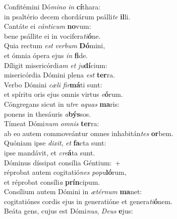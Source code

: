 \evenverse Confitémini Dó\textit{mi}\textit{no} \textit{in} \textbf{cí}thara:~\*\\
\evenverse in psaltério decem chordárum psálli\textit{te} \textbf{il}li.\\
\oddverse Cantáte ei \textit{cán}\textit{ti}\textit{cum} \textbf{no}vum:~\*\\
\oddverse bene psállite ei in vocifera\textit{ti}\textbf{ó}ne.\\
\evenverse Quia rectum \textit{est} \textit{ver}\textit{bum} \textbf{Dó}mini,~\*\\
\evenverse et ómnia ópera ejus \textit{in} \textbf{fi}de.\\
\oddverse Díligit misericórdi\textit{am} \textit{et} \textit{ju}\textbf{dí}cium:~\*\\
\oddverse misericórdia Dómini plena \textit{est} \textbf{ter}ra.\\
\evenverse Verbo Dómini \textit{cæ}\textit{li} \textit{fir}\textbf{má}ti sunt:~\*\\
\evenverse et spíritu oris ejus omnis virtus \textit{e}\textbf{ó}rum.\\
\oddverse Cóngregans sicut in u\textit{tre} \textit{a}\textit{quas} \textbf{ma}ris:~\*\\
\oddverse ponens in thesáuris \textit{a}\textbf{býs}sos.\\
\evenverse Tímeat Dómi\textit{num} \textit{om}\textit{nis} \textbf{ter}ra:~\*\\
\evenverse ab eo autem commoveántur omnes inhabitán\textit{tes} \textbf{or}bem.\\
\oddverse Quóniam ipse \textit{di}\textit{xit}, \textit{et} \textbf{fa}cta sunt:~\*\\
\oddverse ipse mandávit, et \textit{cre}\textbf{á}ta sunt.\\
\evenverse Dóminus díssipat consília Géntium:~+\\
\evenverse  réprobat autem cogitatió\textit{nes} \textit{po}\textit{pu}\textbf{ló}rum,~\*\\
\evenverse et réprobat consíli\textit{a} \textbf{prín}cipum.\\
\oddverse Consílium autem Dómini in \textit{æ}\textit{tér}\textit{num} \textbf{ma}net:~\*\\
\oddverse cogitatiónes cordis ejus in generatióne et genera\textit{ti}\textbf{ó}nem.\\
\evenverse Beáta gens, cujus est Dómi\textit{nus}, \textit{De}\textit{us} \textbf{e}jus:~\*\\
